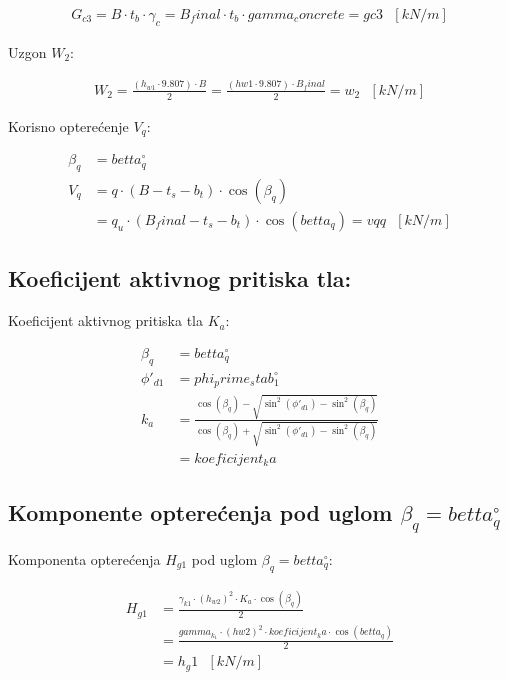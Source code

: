 \documentclass[a4paper, 11pt]{article}
\begin{document}
\begin{align*}
G_{c3} = B \cdot t_{b} \cdot \gamma_c = B_final \cdot t_b \cdot gamma_concrete = gc3 \text{ } [kN/m]
\end{align*}

Uzgon $W_{2}$:

\begin{align*}
W_{2} = \frac{(h_{w1} \cdot 9.807) \cdot B}{2} = \frac{(hw1 \cdot 9.807) \cdot B_final}{2} = w_2 \text{ } [kN/m]
\end{align*}
 
 
Korisno optere\'cenje $V_{q}$:

\begin{align*}
\beta_{q} &= betta_q ^\circ \\
V_{q} &= q \cdot  ( B - t_{s} - b_{t}) \cdot \cos(\beta_{q})  \\
      &= q_u \cdot (B_final - t_s - b_t) \cdot \cos(betta_q) = vqq \text{ } [kN/m]
\end{align*}



\subsection*{Koeficijent aktivnog pritiska tla:}

Koeficijent aktivnog pritiska tla $K_{a}$:

\begin{align*}
\beta_{q} &= betta_q ^\circ \\
\phi'_{d1} &= phi_prime_stab_1 ^\circ  \\
k_a &= \frac{\cos(\beta_q) - \sqrt{\sin^2(\phi'_{d1}) - \sin^2(\beta_q)}}{\cos(\beta_q) + \sqrt{\sin^2(\phi'_{d1}) - \sin^2(\beta_q)}} \\
	&= koeficijent_ka
\end{align*}

\subsection*{Komponente optere\'cenja pod uglom $\beta_{q} = betta_q ^ \circ$}

Komponenta optere\'cenja $H_{g1}$ pod uglom $\beta_{q} = betta_q ^ \circ$:

\begin{align*}
H_{g1} &= \frac{\gamma_{k1} \cdot \left(h_{w2} \right)^2 \cdot K_{a} \cdot \cos(\beta_q)}{2}\\
	   &=  \frac{gamma_k_1 \cdot \left(hw2 \right)^2 \cdot koeficijent_ka \cdot \cos(betta_q)}{2} \\
	   &= h_g1 \text{ } [kN/m] \\
\end{align*}
\end{document}

